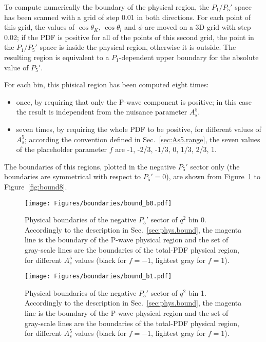 To compute numerically the boundary of the physical region, the $P_1/P_5'$ space has been scanned with a grid of step 0.01 in both directions. For each point of this grid, the values of $\cos\theta_K$, $\cos\theta_l$ and $\phi$ are moved on a 3D grid with step 0.02; if the PDF is positive for all of the points of this second grid, the point in the $P_1/P_5'$ space is inside the physical region, otherwise it is outside. The resulting region is equivalent to a $P_1$-dependent upper boundary for the absolute value of $P_5'$.

For each bin, this phisical region has been computed eight times:
\begin{itemize}
\item once, by requiring that only the P-wave component is positive; in this case the result is independent from the nuisance parameter $A_s^5$.
\item seven times, by requiring the whole PDF to be positive, for different values of $A_s^5$; according the convention defined in Sec.~\ref{sec:As5.range}, the seven values of the placeholder parameter $f$ are {-1, -2/3, -1/3, 0, 1/3, 2/3, 1}.
\end{itemize}

The boundaries of this regions, plotted in the negative $P_5'$ sector only (the boundaries are symmetrical with respect to $P_5'=0$), are shown from Figure~\ref{fig:bound0} to Figure~\ref{fig:bound8}.

\begin{figure}[!hbt]
  \centering
  \texttt{[image: Figures/boundaries/bound\_b0.pdf]}
  \caption{Physical boundaries of the negative $P_5'$ sector of $q^2$ bin 0. Accordingly to the description in Sec.~\ref{sec:phys.bound}, the magenta line is the boundary of the P-wave physical region and the set of gray-scale lines are the boundaries of the total-PDF physical region, for different $A_s^5$ values (black for $f=-1$, lightest gray for $f=1$).}
  \label{fig:bound0}
\end{figure}

\begin{figure}[!hbt]
  \centering
  \texttt{[image: Figures/boundaries/bound\_b1.pdf]}
  \caption{Physical boundaries of the negative $P_5'$ sector of $q^2$ bin 1. Accordingly to the description in Sec.~\ref{sec:phys.bound}, the magenta line is the boundary of the P-wave physical region and the set of gray-scale lines are the boundaries of the total-PDF physical region, for different $A_s^5$ values (black for $f=-1$, lightest gray for $f=1$).}
  \label{fig:bound1}
\end{figure}


